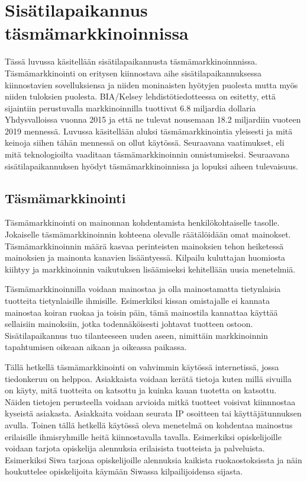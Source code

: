 \section{Sisätilapaikannus täsmämarkkinoinnissa}
Tässä luvussa käsitellään sisätilapaikannusta täsmämarkkinoinnnissa. Täsmämarkkinointi on eritysen kiinnostava aihe sisätilapaikannuksessa kiinnostavien sovelluksiensa ja niiden moninaisten hyötyjen puolesta mutta myös niiden tuloksien puolesta. BIA/Kelsey\cite{press} lehdistötiedotteessa on esitetty, että sijaintiin perustuvalla markkinoinnilla tuottivat 6.8 miljardia dollaria Yhdysvalloissa vuonna 2015 ja että ne tulevat nousemaan 18.2 miljardiin vuoteen 2019 mennessä.
Luvussa käsitellään aluksi täsmämarkkinointia yleisesti ja mitä keinoja siihen tähän mennessä on ollut käytössä. Seuraavana vaatimukset, eli mitä teknologioilta vaaditaan täsmämarkkinoinnin onnistumiseksi. Seuraavana sisätilapaikannuksen hyödyt täsmämarkkinoinnissa ja lopuksi aiheen tulevaisuus.
\subsection{Täsmämarkkinointi}
Täsmämarkkinointi on mainonnan kohdentamista henkilökohtaiselle tasolle. Jokaiselle täsmämarkkinoinnin kohteena olevalle räätälöidään omat mainokset. Täsmämarkkinoinnin määrä kasvaa perinteisten mainoksien tehon heiketessä mainoksien ja mainonta kanavien lisääntyessä\cite{tasma}. Kilpailu kuluttajan huomiosta kiihtyy ja markkinoinnin vaikutuksen lisäämiseksi kehitellään uusia menetelmiä.

Täsmämarkkinoinnilla voidaan mainostaa ja olla mainostamatta tietynlaisia tuotteita tietynlaisille ihmisille. Esimerkiksi kissan omistajalle ei kannata mainostaa koiran ruokaa ja toisin päin\cite{tasma}, tämä mainostila kannattaa käyttää sellaisiin mainoksiin, jotka todennäköisesti johtavat tuotteen ostoon. Sisätilapaikannus tuo tilanteeseen uuden aseen, nimittäin markkinoinnin tapahtumisen oikeaan aikaan ja oikeassa paikassa.

Tällä hetkellä täsmämarkkinointi on vahvimmin käytössä internetissä, jossa tiedonkeruu on helppoa. Asiakkaista voidaan kerätä tietoja kuten millä sivuilla on käyty, mitä tuotteita on katsottu ja kuinka kauan tuotetta on katsottu. Näiden tietojen perusteella voidaan arvioida mitkä tuotteet voisivat kiinnnostaa kyseistä asiakasta. Asiakkaita voidaan seurata IP osoitteen tai käyttäjätunnuksen avulla.
Toinen tällä hetkellä käytössä oleva menetelmä on kohdentaa mainostus erilaisille ihmisryhmille heitä kiinnostavalla tavalla. Esimerkiksi opiskelijoille voidaan tarjota opiskelija alennuksia erilaisista tuotteista ja palveluista. Esimerkiksi Siwa tarjoaa opiskelijoille alennuksia kaikista ruokaostoksissta\cite{siwa} ja näin houkuttelee opiskelijoita käymään Siwassa kilpailijoidensa sijasta. 

